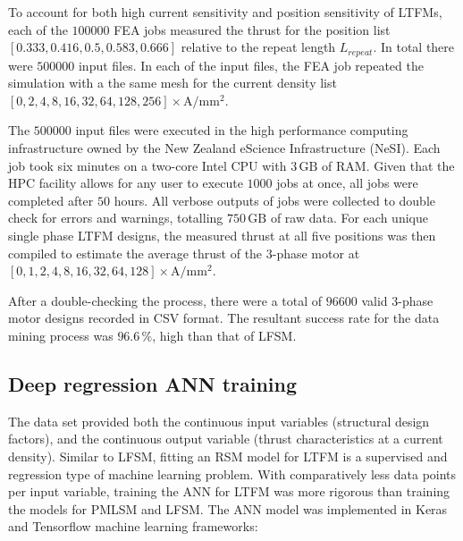             
            To account for both high current sensitivity and position sensitivity of \acsp{LTFM}, each of the $100000$ \acs{FEA} jobs measured the thrust for the position list $[0.333,0.416,0.5,0.583,0.666]$ relative to the repeat length $L_{repeat}$. In total there were $500000$ input files. In each of the input files, the \acs{FEA} job repeated the simulation with a the same mesh for the current density list $[0,2,4,8,16,32,64,128,256]\times\mathrm{A/mm^2}$. 
            
            
            The $500000$ input files were executed in the high performance computing infrastructure owned by the New Zealand eScience Infrastructure (NeSI). Each job took six minutes on a two-core Intel CPU with $3\,\mathrm{GB}$ of RAM. Given that the HPC facility allows for any user to execute $1000$ jobs at once, all jobs were completed after $50$ hours. All verbose outputs of jobs were collected to double check for errors and warnings, totalling $750\,\mathrm{GB}$ of raw data. For each unique single phase \acs{LTFM} designs, the measured thrust at all five positions was then compiled to estimate the average thrust of the 3-phase motor at $[0,1,2,4,8,16,32,64,128]\times\mathrm{A/mm^2}$.
            
            
            After a double-checking the process, there were a total of $96600$ valid 3-phase motor designs recorded in CSV format. The resultant success rate for the data mining process was $96.6\,\%$, high than that of \acs{LFSM}.
            
            
        \subsection{Deep regression ANN training}   \label{Chapter:RSM/LTFM/ANN training}
        
            
            The data set provided both the continuous input variables (structural design factors), and the continuous output variable (thrust characteristics at a current density). Similar to \acs{LFSM}, fitting an \acs{RSM} model for \acs{LTFM} is a supervised and regression type of machine learning problem. With comparatively less data points per input variable, training the \acs{ANN} for \acs{LTFM} was more rigorous than training the models for \acs{PMLSM} and \acs{LFSM}. The \acs{ANN} model was implemented in Keras and Tensorflow machine learning frameworks:
            
